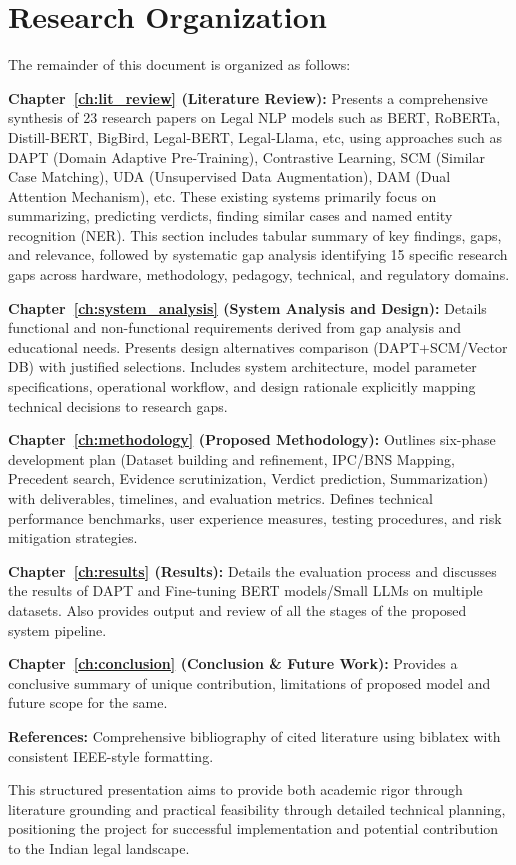 \section{Research Organization}

The remainder of this document is organized as follows:

\textbf{Chapter~\ref{ch:lit_review} (Literature Review):} Presents a comprehensive synthesis of 23 research papers on Legal NLP models such as BERT, RoBERTa, Distill-BERT, BigBird, Legal-BERT, Legal-Llama, etc, using approaches such as DAPT (Domain Adaptive Pre-Training), Contrastive Learning, SCM (Similar Case Matching), UDA (Unsupervised Data Augmentation), DAM (Dual Attention Mechanism), etc. These existing systems primarily focus on summarizing, predicting verdicts, finding similar cases and named entity recognition (NER). This section includes tabular summary of key findings, gaps, and relevance, followed by systematic gap analysis identifying 15 specific research gaps across hardware, methodology, pedagogy, technical, and regulatory domains.

\textbf{Chapter~\ref{ch:system_analysis} (System Analysis and Design):} Details functional and non-functional requirements derived from gap analysis and educational needs. Presents design alternatives comparison (DAPT+SCM/Vector DB) with justified selections. Includes system architecture, model parameter specifications, operational workflow, and design rationale explicitly mapping technical decisions to research gaps.

\textbf{Chapter~\ref{ch:methodology} (Proposed Methodology):} Outlines six-phase development plan (Dataset building and refinement, IPC/BNS Mapping, Precedent search, Evidence scrutinization,  Verdict prediction, Summarization) with deliverables, timelines, and evaluation metrics. Defines technical performance benchmarks, user experience measures, testing procedures, and risk mitigation strategies. 

\textbf{Chapter~\ref{ch:results} (Results):} 
Details the evaluation process and discusses the results of DAPT and Fine-tuning BERT models/Small LLMs on multiple datasets. Also provides output and review of all the stages of the proposed system pipeline. 

\textbf{Chapter~\ref{ch:conclusion} (Conclusion \& Future Work):} 
Provides a conclusive summary of unique contribution, limitations of proposed model and future scope for the same.
 

\textbf{References:} Comprehensive bibliography of cited literature using biblatex with consistent IEEE-style formatting.

This structured presentation aims to provide both academic rigor through literature grounding and practical feasibility through detailed technical planning, positioning the project for successful implementation and potential contribution to the Indian legal landscape.


